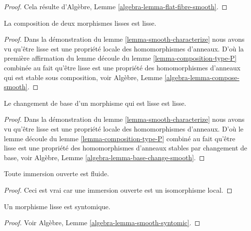 \begin{proof}
Cela résulte d'Algèbre, Lemme \ref{algebra-lemma-flat-fibre-smooth}.
\end{proof}

\begin{lemma}
\label{lemma-composition-smooth}
La composition de deux morphismes lisses est lisse.
\end{lemma}

\begin{proof}
Dans la démonstration du lemme \ref{lemma-smooth-characterize} nous avons
vu qu'être lisse est une propriété locale des homomorphismes
d'anneaux. D'où la première affirmation
du lemme découle du lemme \ref{lemma-composition-type-P} combinée
au fait qu'être lisse est une propriété des homomorphismes d'anneaux
qui est stable sous
composition, voir Algèbre, Lemme \ref{algebra-lemma-compose-smooth}.
\end{proof}

\begin{lemma}
\label{lemma-base-change-smooth}
Le changement de base d'un morphisme qui est lisse est lisse.
\end{lemma}

\begin{proof}
Dans la démonstration du lemme \ref{lemma-smooth-characterize} nous avons
vu qu'être lisse est une propriété locale des homomorphismes
d'anneaux. D'où
le lemme découle du lemme \ref{lemma-composition-type-P} combiné
au fait qu'être lisse est une propriété des homomorphismes
d'anneaux stables par changement
de base, voir Algèbre, Lemme \ref{algebra-lemma-base-change-smooth}.
\end{proof}

\begin{lemma}
\label{lemma-open-immersion-smooth}
Toute immersion ouverte est fluide.
\end{lemma}

\begin{proof}
Ceci est vrai car une immersion ouverte est un isomorphisme local.
\end{proof}

\begin{lemma}
\label{lemma-smooth-syntomic}
Un morphisme lisse est syntomique.
\end{lemma}

\begin{proof}
Voir Algèbre, Lemme \ref{algebra-lemma-smooth-syntomic}.
\end{proof}

